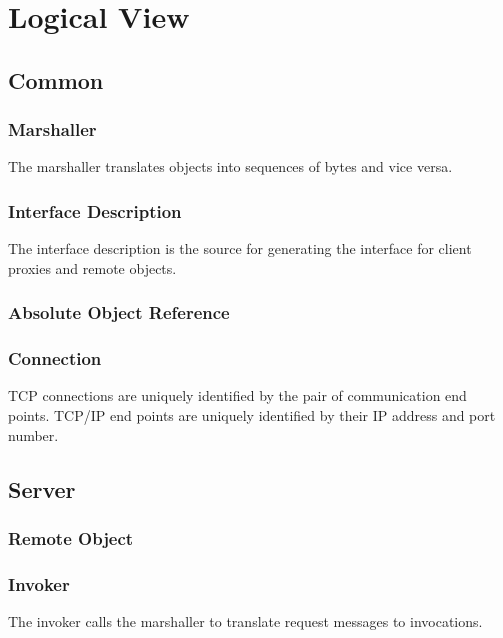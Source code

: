 \section{Logical View}

\cite{zdun2008}

\subsection{Common}
\subsubsection{Marshaller}

The marshaller translates objects into sequences of bytes and vice versa.

\subsubsection{Interface Description}

The interface description is the source for generating the interface for client proxies and remote objects.

\subsubsection{Absolute Object Reference}

\subsubsection{Connection}

TCP connections are uniquely identified by the pair of communication end points.
TCP/IP end points are uniquely identified by their IP address and port number.

\subsection{Server}

\subsubsection{Remote Object}

\subsubsection{Invoker}

The invoker calls the marshaller to translate request messages to invocations.


